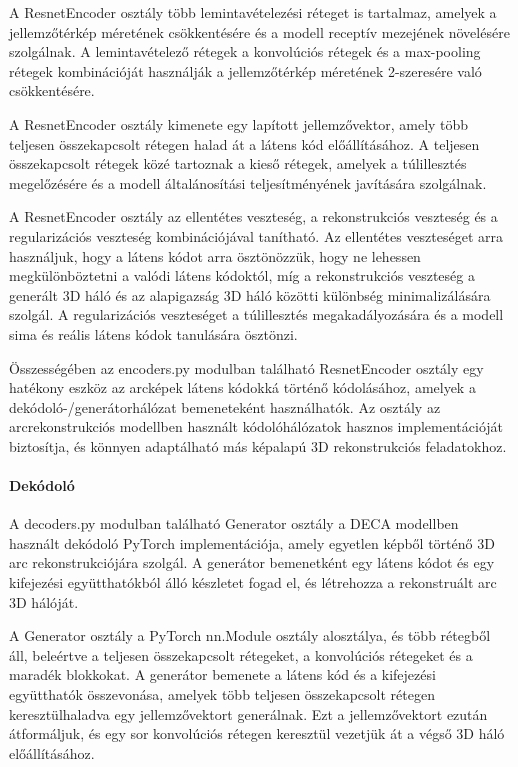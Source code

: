 \documentclass[12pt,a4]{article}
\begin{document}
            A ResnetEncoder osztály több lemintavételezési réteget is tartalmaz, amelyek a jellemzőtérkép méretének csökkentésére és a modell receptív mezejének növelésére szolgálnak.
            A lemintavételező rétegek a konvolúciós rétegek és a max-pooling rétegek kombinációját használják a jellemzőtérkép méretének 2-szeresére való csökkentésére.
            
            A ResnetEncoder osztály kimenete egy lapított jellemzővektor, amely több teljesen összekapcsolt rétegen halad át a látens kód előállításához. 
            A teljesen összekapcsolt rétegek közé tartoznak a kieső rétegek, amelyek a túlillesztés megelőzésére és a modell általánosítási teljesítményének javítására szolgálnak.
            
            A ResnetEncoder osztály az ellentétes veszteség, a rekonstrukciós veszteség és a regularizációs veszteség kombinációjával tanítható.
            Az ellentétes veszteséget arra használjuk, hogy a látens kódot arra ösztönözzük, hogy ne lehessen megkülönböztetni a valódi látens kódoktól, 
            míg a rekonstrukciós veszteség a generált 3D háló és az alapigazság 3D háló közötti különbség minimalizálására szolgál.
            A regularizációs veszteséget a túlillesztés megakadályozására és a modell sima és reális látens kódok tanulására ösztönzi.
            
            Összességében az encoders.py modulban található ResnetEncoder osztály egy hatékony eszköz az arcképek látens kódokká történő kódolásához, amelyek a dekódoló-/generátorhálózat bemeneteként használhatók. 
            Az osztály az arcrekonstrukciós modellben használt kódolóhálózatok hasznos implementációját biztosítja, és könnyen adaptálható más képalapú 3D rekonstrukciós feladatokhoz.
         
         \paragraph{Dekódoló}

             A decoders.py modulban található Generator osztály a DECA modellben használt dekódoló PyTorch implementációja, amely egyetlen képből történő 3D arc rekonstrukciójára szolgál.
             A generátor bemenetként egy látens kódot és egy kifejezési együtthatókból álló készletet fogad el, és létrehozza a rekonstruált arc 3D hálóját.
             
             A Generator osztály a PyTorch nn.Module osztály alosztálya, és több rétegből áll, beleértve a teljesen összekapcsolt rétegeket, a konvolúciós rétegeket és a maradék blokkokat. 
             A generátor bemenete a látens kód és a kifejezési együtthatók összevonása, amelyek több teljesen összekapcsolt rétegen keresztülhaladva egy jellemzővektort generálnak. 
             Ezt a jellemzővektort ezután átformáljuk, és egy sor konvolúciós rétegen keresztül vezetjük át a végső 3D háló előállításához.
            
\end{document}
